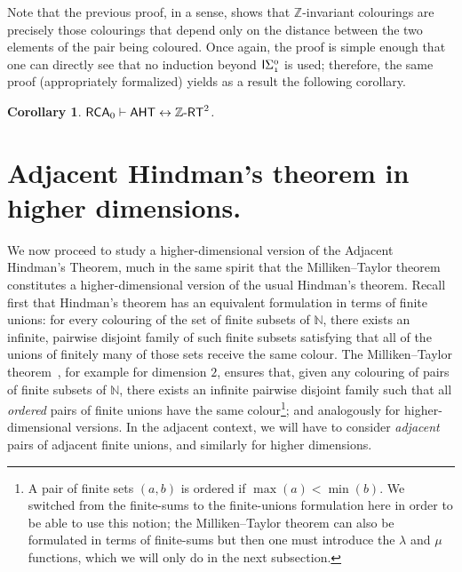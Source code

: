 \documentclass[10pt,a4paper]{amsart}
\newcommand{\zrt}{\mathnormal{\mathbb Z\text{-}\mathsf{RT}}}
\newcommand{\aht}{\mathnormal{\mathsf{AHT}}}
\newcommand{\rca}{\mathnormal{\mathsf{RCA}}_0}
\newcommand{\isigma}{\mathnormal{\mathsf{I}\mathrm{\Sigma}_1^0}}
\newtheorem{corollary}[theorem]{Corollary}
\theoremstyle{definition}
\begin{document}
Note that the previous proof, in a sense, shows that $\mathbb Z$-invariant colourings are precisely those colourings that depend only on the distance between the two elements of the pair being coloured. Once again, the proof is simple enough that one can directly see that no induction beyond $\isigma$ is used; therefore, the same proof (appropriately formalized) yields as a result the following corollary.

\begin{corollary}
$\rca\vdash\aht\leftrightarrow\zrt^2$.
\end{corollary}

\section{Adjacent Hindman's theorem in higher dimensions.}

We now proceed to study a higher-dimensional version of the Adjacent Hindman's Theorem, much in the same spirit that the Milliken--Taylor theorem constitutes a higher-dimensional version of the usual Hindman's theorem. Recall first that Hindman's theorem has an equivalent formulation in terms of finite unions: for every colouring of the set of finite subsets of $\mathbb N$, there exists an infinite, pairwise disjoint family of such finite subsets satisfying that all of the unions of finitely many of those sets receive the same colour. The Milliken--Taylor theorem~\cite{milliken-thm,taylor-thm}, for example for dimension $2$, ensures that, given any colouring of pairs of finite subsets of $\mathbb N$, there exists an infinite pairwise disjoint family such that all {\it ordered} pairs of finite unions have the same colour\footnote{A pair of finite sets $(a,b)$ is ordered if $\max(a)<\min(b)$. We switched from the finite-sums to the finite-unions formulation here in order to be able to use this notion; the Milliken--Taylor theorem can also be formulated in terms of finite-sums but then one must introduce the $\lambda$ and $\mu$ functions, which we will only do in the next subsection.}; and analogously for higher-dimensional versions. In the adjacent context, we will have to consider {\it adjacent} pairs of adjacent finite unions, and similarly for higher dimensions.
\end{document}
